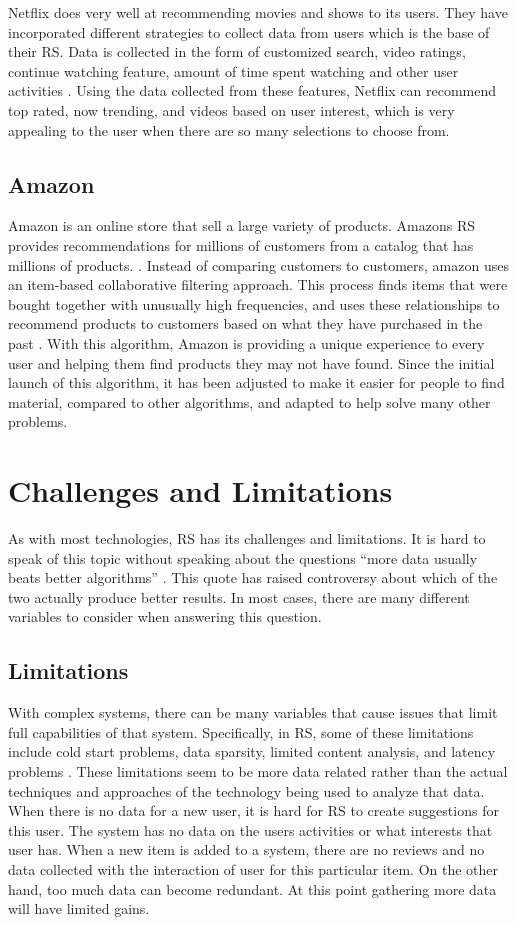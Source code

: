 \documentclass[sigconf]{acmart}
\begin{document}
Netflix does very well at recommending movies and shows to its users. They have incorporated different
strategies to collect data from users which is the base of their RS. Data is collected in the form of
customized search, video ratings, continue watching feature, amount of time spent watching and other user
activities \cite{Gomez-Uribe2015}. Using the data collected from these features, Netflix can recommend top
rated, now trending, and videos based on user interest, which is very appealing to the user when there are so
many selections to choose from. 

\subsection{Amazon}
Amazon is an online store that sell a large variety of products. Amazons RS provides recommendations for
millions of customers from a catalog that has millions of products. \cite{Smith2017}. Instead of comparing
customers to customers, amazon uses an item-based collaborative filtering approach. This process finds items
that were bought together with unusually high frequencies, and uses these relationships to recommend products
to customers based on what they have purchased in the past \cite{Smith2017}. With this algorithm, Amazon is
providing a unique experience to every user and helping them find products they may not have found. Since the
initial launch of this algorithm, it has been adjusted to make it easier for people to find material, compared to other algorithms, and adapted to help solve many other problems.  \cite{Smith2017}

\section{Challenges and Limitations}
As with most technologies, RS has its challenges and limitations. It is hard to speak of this topic without
speaking about the questions ``more data usually beats better algorithms'' \cite{Rajaraman2008}. This quote has
raised controversy about which of the two actually produce better results. In most cases, there are many
different variables to consider when answering this question. 


\subsection{Limitations}
With complex systems, there can be many variables that cause issues that limit full capabilities of that
system. Specifically, in RS, some of these limitations include cold start problems, data sparsity, limited
content analysis, and latency problems \cite{Khusro2016}. These limitations seem to be more data related rather
than the actual techniques and approaches of the technology being used to analyze that data. When there is no
data for a new user, it is hard for RS to create suggestions for this user. The system has no data on the users
activities or what interests that user has. When a new item is added to a system, there are no reviews and no
data collected with the interaction of user for this particular item. On the other hand, too much data can
become redundant. At this point gathering more data will have limited gains. 
\end{document}
